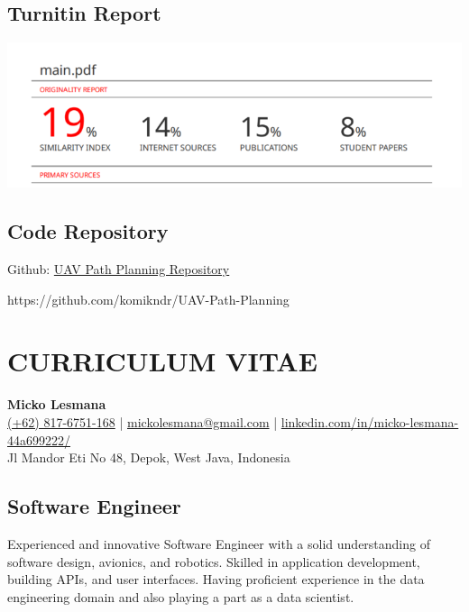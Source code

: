 \documentclass[12pt]{report}
\begin{document}
    \section*{Turnitin Report}
    \includegraphics[width=\textwidth]{General Image/Turnitin.PNG}
    \section*{Code Repository}
    Github: \href{https://github.com/komikndr/UAV-Path-Planning}{UAV Path Planning Repository}\par
    https://github.com/komikndr/UAV-Path-Planning

    \chapter*{CURRICULUM VITAE}
    \begin{center}
        \textbf{\Large Micko Lesmana} \\
        \href{tel:+628176751168}{(+62) 817-6751-168} | \href{mailto:mickolesmana@gmail.com}{mickolesmana@gmail.com} |
        \href{https://www.linkedin.com/in/micko-lesmana-44a699222/}{linkedin.com/in/micko-lesmana-44a699222/} \\
        Jl Mandor Eti No 48, Depok, West Java, Indonesia
    \end{center}

    \section*{Software Engineer}
    Experienced and innovative Software Engineer with a solid understanding of software design, avionics, and robotics.
    Skilled in application development, building APIs, and user interfaces. Having proficient experience in the data
    engineering domain and also playing a part as a data scientist.
\end{document}
